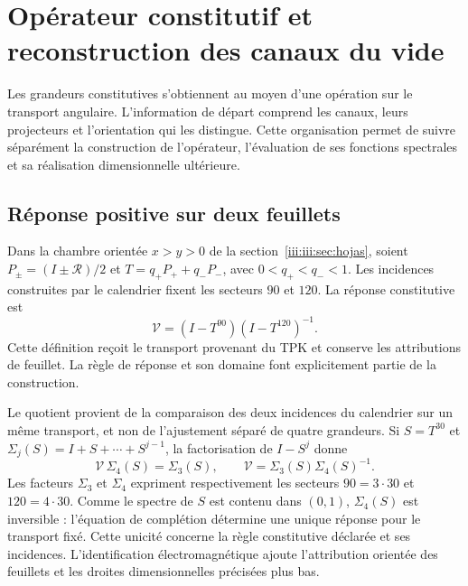\section{Opérateur constitutif et reconstruction des canaux du vide}
\label{iii:iii:sec:constitutiva}

Les grandeurs constitutives s'obtiennent au moyen d'une opération sur le transport angulaire. L'information de départ comprend les canaux, leurs projecteurs et l'orientation qui les distingue. Cette organisation permet de suivre séparément la construction de l'opérateur, l'évaluation de ses fonctions spectrales et sa réalisation dimensionnelle ultérieure.

\subsection{Réponse positive sur deux feuillets}

Dans la chambre orientée $x>y>0$ de la section~\ref{iii:iii:sec:hojas}, soient
$P_\pm=(I\pm\mathcal R)/2$ et
$T=q_+P_++q_-P_-$, avec $0<q_+<q_-<1$. Les incidences construites par le
calendrier fixent les secteurs $90$ et $120$. La réponse constitutive est
\begin{equation}
 \mathcal V=(I-T^{90})(I-T^{120})^{-1}.
 \label{iii:iii:eq:vacuum-op}
\end{equation}
Cette définition reçoit le transport provenant du TPK et conserve les
attributions de feuillet. La règle de réponse et son domaine font explicitement partie
de la construction.

Le quotient provient de la comparaison des deux incidences du calendrier sur un même transport, et non de l'ajustement séparé de quatre grandeurs. Si $S=T^{30}$ et $\Sigma_j(S)=I+S+\cdots+S^{j-1}$, la factorisation de $I-S^j$ donne
\begin{equation}
 \mathcal V\,\Sigma_4(S)=\Sigma_3(S),\qquad
 \mathcal V=\Sigma_3(S)\Sigma_4(S)^{-1}.
 \label{iii:iii:eq:completion-response}
\end{equation}
Les facteurs $\Sigma_3$ et $\Sigma_4$ expriment respectivement les
secteurs $90=3\cdot30$ et $120=4\cdot30$. Comme le spectre de $S$ est
contenu dans $(0,1)$, $\Sigma_4(S)$ est inversible : l’équation de
complétion détermine une unique réponse pour le transport fixé.
Cette unicité concerne la règle constitutive déclarée et ses
incidences. L’identification électromagnétique ajoute l’attribution
orientée des feuillets et les droites dimensionnelles précisées plus
bas.

